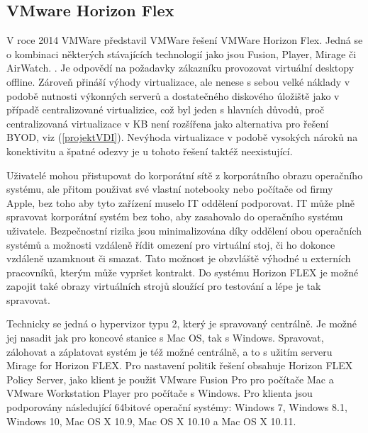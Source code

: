 \subsection{VMware Horizon Flex}
V roce 2014 VMWare představil VMWare řešení VMWare Horizon Flex. Jedná se o kombinaci některých stávajících technologií jako jsou Fusion, Player, Mirage či AirWatch. . Je odpovědí na požadavky zákazníku provozovat virtuální desktopy offline. Zároveň přináší výhody virtualizace, ale nenese s sebou velké náklady v podobě nutnosti výkonných serverů a dostatečného diskového úložiště jako v případě centralizované virtualizice, což byl jeden s hlavních důvodů, proč centralizovaná virtualizace v KB není rozšířena jako alternativa pro řešení BYOD, viz (\ref{projektVDI}). Nevýhoda virtualizace v podobě vysokých nároků na konektivitu a špatné odezvy je u tohoto řešení taktéž neexistující. 

Uživatelé mohou přistupovat do korporátní sítě z korporátního obrazu operačního systému, ale přitom použivat své vlastní notebooky nebo počítače od firmy Apple, bez toho aby tyto zařízení muselo IT oddělení podporovat. IT může plně spravovat korporátní systém bez toho, aby zasahovalo do operačního systému uživatele. Bezpečnostní rizika jsou minimalizována díky oddělení obou operačních systémů a možnosti vzdáleně řídit omezení pro virtuální stoj, či ho dokonce vzdáleně uzamknout či smazat. Tato možnost je obzvláště výhodné u externích pracovníků, kterým může vypršet kontrakt. Do systému Horizon FLEX je možné zapojit také obrazy virtuálních strojů sloužící pro testování a lépe je tak spravovat.

Technicky se jedná o hypervizor typu 2, který je spravovaný centrálně. Je možné jej nasadit jak pro koncové stanice s Mac OS, tak s Windows. Spravovat, zálohovat a záplatovat systém je též možné centrálně, a to s užitím serveru Mirage for Horizon FLEX. Pro nastavení politik řešení obsahuje Horizon FLEX Policy Server, jako klient je použit VMware Fusion Pro pro počítače Mac a VMware Workstation Player pro počítače s Windows.   Pro klienta jsou podporovány následující 64bitové operační systémy: Windows 7, Windows 8.1, Windows 10, Mac OS X 10.9, Mac OS X 10.10 a Mac OS X 10.11.

